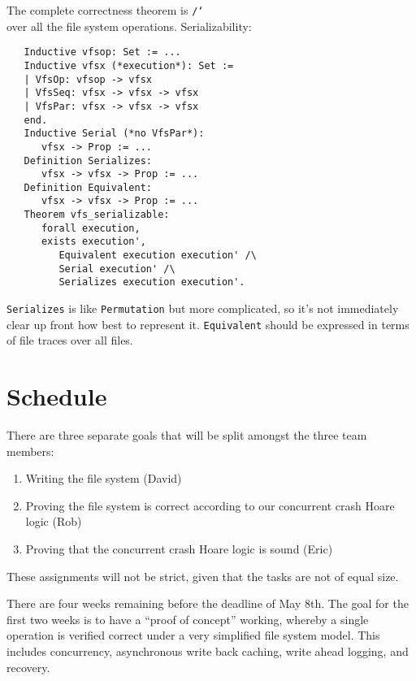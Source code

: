 \documentclass[11pt, twocolumn, letterpaper]{article}
\newcommand{\bs}{{\tt\char`\\}}
\newcommand{\coqsize}{\scriptsize}
\begin{document}
The complete correctness theorem is \texttt{/\bs} over all the file
system operations.
Serializability:

{\coqsize
\begin{verbatim}
   Inductive vfsop: Set := ...
   Inductive vfsx (*execution*): Set :=
   | VfsOp: vfsop -> vfsx
   | VfsSeq: vfsx -> vfsx -> vfsx
   | VfsPar: vfsx -> vfsx -> vfsx
   end.
   Inductive Serial (*no VfsPar*):
      vfsx -> Prop := ...
   Definition Serializes:
      vfsx -> vfsx -> Prop := ...
   Definition Equivalent:
      vfsx -> vfsx -> Prop := ...
   Theorem vfs_serializable:
      forall execution,
      exists execution',
         Equivalent execution execution' /\
         Serial execution' /\
         Serializes execution execution'.
\end{verbatim}
}

\texttt{Serializes} is like \texttt{Permutation} but more complicated,
so it's not immediately clear up front how best to represent it.
\texttt{Equivalent} should be expressed in terms of file traces over
all files.

\section{Schedule}

%

There are three separate goals that will be split amongst the three team
members:

\begin{enumerate}
    \item Writing the file system (David)

    \item Proving the file system is correct according to our
concurrent crash Hoare logic (Rob)

    \item Proving that the concurrent crash Hoare logic is sound (Eric)
\end{enumerate}

These assignments will not be strict, given that the tasks are not
of equal size.

There are four weeks remaining before the deadline of May 8th. The goal for the
first two weeks is to have a ``proof of concept'' working, whereby a single
operation is verified correct under a very simplified file system model. This
includes concurrency, asynchronous write back caching, write ahead logging, and
recovery.
\end{document}
